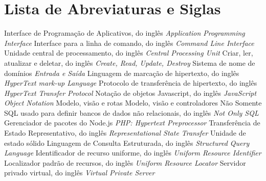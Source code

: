 \chapter*{Lista de Abreviaturas e Siglas}


\begin{acronym}
 {Interface de Programação de Aplicativos, do inglês \textit{Application Programming Interface}}
 {Interface para a linha de comando, do inglês \textit{Command Line Interface}}
 {Unidade central de processamento, do inglês \textit{Central Processing Unit}}
 {Criar, ler, atualizar e deletar, do inglês \textit{Create, Read, Update, Destroy}}
 {Sistema de nome de domínios}
 {\textit{Entrada e Saída}}
 {Linguagem de marcação de hipertexto, do inglês \textit{HyperText mark-up Language}}
 {Protocolo de transferência de hipertexto, do inglês \textit{HyperText Transfer Protocol}}
 {Notação de objetos Javascript, do inglês \textit{JavaScript Object Notation}}
 {Modelo, visão e rotas}
 {Modelo, visão e controladores}
 {Não Somente SQL usado para definir bancos de dados não relacionais, do inglês \textit{Not Only SQL}}
 {Gerenciador de pacotes do Node.js}
 {\textit{PHP: Hypertext Preprocessor}}
 {Transferência de Estado Representativo, do inglês \textit{Representational State Transfer}}
 {Unidade de estado sólido}
 {Linguagem de Consulta Estruturada, do inglês \textit{Structured Query Language}}
 {Identificador de recurso uniforme, do inglês \textit{Uniform Resource Identifier}}
 {Localizador padrão de recursos, do inglês \textit{Uniform Resource Locator}}
 {Servidor privado virtual, do inglês \textit{Virtual Private Server}}




\end{acronym}

